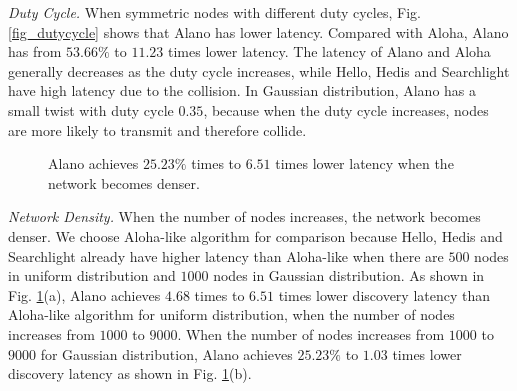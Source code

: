 \emph{Duty Cycle.}
When symmetric nodes with different duty cycles, Fig. \ref{fig_dutycycle} shows that Alano has lower latency. Compared with Aloha, Alano has from $53.66\%$ to $11.23$ times lower latency. The latency of Alano and Aloha generally decreases as the duty cycle increases, while Hello, Hedis and Searchlight have high latency due to the collision. In Gaussian distribution, Alano has a small twist with duty cycle $0.35$, because when the duty cycle increases, nodes are more likely to transmit and therefore collide.


\begin{figure}[!h]
\centering
{}
\hspace{0.01in}
\caption{Alano achieves $25.23\%$ times to $6.51$ times lower latency when the network becomes denser.}
\label{fig_node}
\end{figure}

\emph{Network Density.}
When the number of nodes increases, the network becomes denser. We choose Aloha-like algorithm for comparison because Hello, Hedis and Searchlight already have higher latency than Aloha-like when there are $500$ nodes in uniform distribution and $1000$ nodes in Gaussian distribution.
As shown in Fig. \ref{fig_node}(a), Alano achieves $4.68$ times to $6.51$ times lower discovery latency than Aloha-like algorithm for uniform distribution, when the number of nodes increases from $1000$ to $9000$.
When the number of nodes increases from $1000$ to $9000$ for Gaussian distribution, Alano achieves $25.23\%$ to $1.03$ times lower discovery latency as shown in Fig. \ref{fig_node}(b).  

